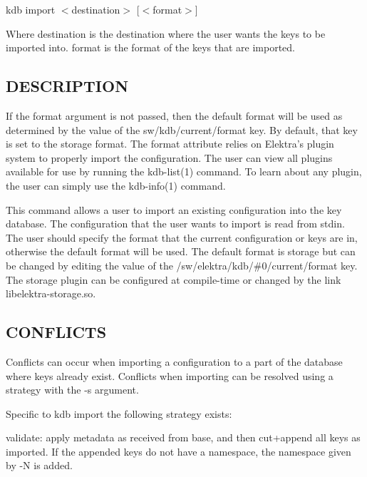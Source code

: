 {\ttfamily kdb import $<$destination$>$ \mbox{[}$<$format$>$\mbox{]}}

Where {\ttfamily destination} is the destination where the user wants the keys to be imported into. {\ttfamily format} is the format of the keys that are imported.

\subsection*{D\+E\+S\+C\+R\+I\+P\+T\+I\+ON}

If the {\ttfamily format} argument is not passed, then the default format will be used as determined by the value of the {\ttfamily sw/kdb/current/format} key. By default, that key is set to the {\ttfamily storage} format. The {\ttfamily format} attribute relies on Elektra’s plugin system to properly import the configuration. The user can view all plugins available for use by running the kdb-\/list(1) command. To learn about any plugin, the user can simply use the kdb-\/info(1) command.

This command allows a user to import an existing configuration into the key database. The configuration that the user wants to import is read from {\ttfamily stdin}. The user should specify the format that the current configuration or keys are in, otherwise the default format will be used. The default format is {\ttfamily storage} but can be changed by editing the value of the {\ttfamily /sw/elektra/kdb/\#0/current/format} key. The {\ttfamily storage} plugin can be configured at compile-\/time or changed by the link {\ttfamily libelektra-\/storage.\+so}.

\subsection*{C\+O\+N\+F\+L\+I\+C\+TS}

Conflicts can occur when importing a configuration to a part of the database where keys already exist. Conflicts when importing can be resolved using a strategy with the {\ttfamily -\/s} argument.

Specific to {\ttfamily kdb import} the following strategy exists\+:


\begin{DoxyItemize}
\item {\ttfamily validate}\+: apply metadata as received from base, and then cut+append all keys as imported. If the appended keys do not have a namespace, the namespace given by {\ttfamily -\/N} is added.
\end{DoxyItemize}

